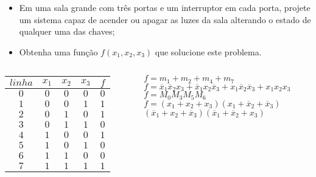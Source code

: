 \begin{frame}{\insertsection} %
	\begin{itemize}
		\item Em uma sala grande com três portas e um interruptor em cada porta, projete um sistema capaz de acender ou apagar as luzes da sala alterando o estado de qualquer uma das chaves;
		\item Obtenha uma função $f(x_1, x_2, x_3)$ que solucione este problema.
    \end{itemize}
    \pause
    \begin{columns}
        \begin{column}{0.40\textwidth}
        \centering
            \begin{tabular}{c|ccc||c} %
            \hline
            \scriptsize $linha$ & $x_1$ & $x_2$ & $x_3$ & $f$ \\
            \hline
            \hline
            \scriptsize $0$ & $0$ & $0$ & $0$ & $0$ \\
             \pause
            \scriptsize $1$ & $0$ & $0$ & $1$ & $1$ \\
             \pause
            \scriptsize $2$ & $0$ & $1$ & $0$ & $1$ \\
             \pause
            \scriptsize $3$ & $0$ & $1$ & $1$ & $0$ \\
             \pause
            \scriptsize $4$ & $1$ & $0$ & $0$ & $1$ \\
             \pause
            \scriptsize $5$ & $1$ & $0$ & $1$ & $0$ \\
             \pause
            \scriptsize $6$ & $1$ & $1$ & $0$ & $0$ \\
             \pause
            \scriptsize $7$ & $1$ & $1$ & $1$ & $1$ \\
            \hline
            \end{tabular}
        \end{column}        
        \begin{column}{0.60\textwidth}
            \pause
            $f = m_1 + m_2 + m_4 + m_7$ \\
            \vspace{0.5cm}
            \pause
            $f = \overline{x}_1\overline{x}_2x_3 + \overline{x}_1x_2\overline{x}_3 + x_1\overline{x}_2\overline{x}_3 + x_1x_2x_3$ \\
            \vspace{0.5cm}
            \pause
            $f = M_0M_3M_5M_6$ \\
            \vspace{0.5cm}
            \pause
            $f = (x_1+x_2+x_3)(x_1+\overline{x}_2+\overline{x}_3)$\\ 
            \hspace{0.65cm} $(\overline{x}_1+x_2+\overline{x}_3)(\overline{x}_1+\overline{x}_2+x_3)$
        \end{column}
    \end{columns}
\end{frame}

